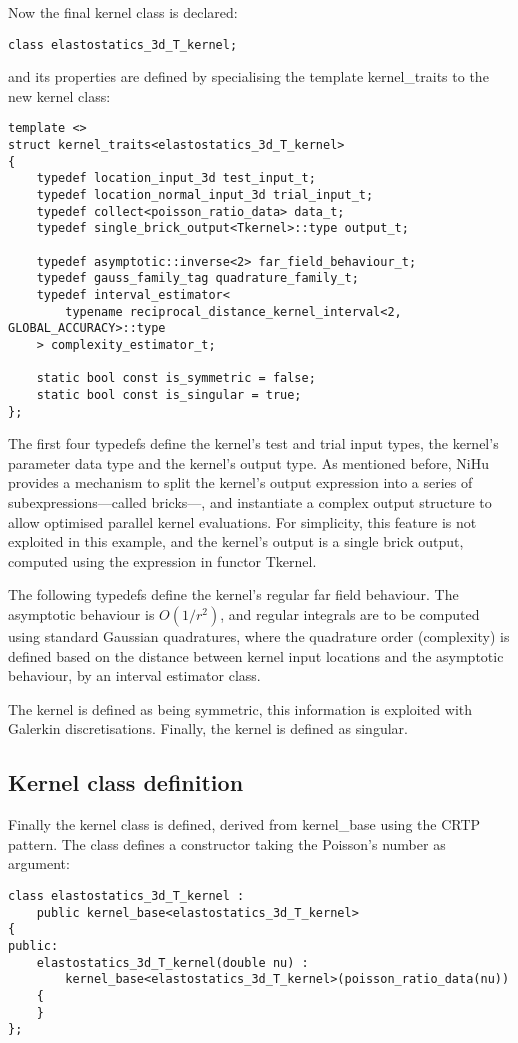 \documentclass{article}
\begin{document}
Now the final kernel class is declared:
%
\begin{lstlisting}
class elastostatics_3d_T_kernel;
\end{lstlisting}
%
and its properties are defined by specialising the template kernel\_traits to the new kernel class:
%
\begin{lstlisting}
template <>
struct kernel_traits<elastostatics_3d_T_kernel>
{
	typedef location_input_3d test_input_t;
	typedef location_normal_input_3d trial_input_t;
	typedef collect<poisson_ratio_data> data_t;
	typedef single_brick_output<Tkernel>::type output_t;
	
	typedef asymptotic::inverse<2> far_field_behaviour_t;
	typedef gauss_family_tag quadrature_family_t;
	typedef interval_estimator<
		typename reciprocal_distance_kernel_interval<2, GLOBAL_ACCURACY>::type
	> complexity_estimator_t;
	
	static bool const is_symmetric = false;
	static bool const is_singular = true;
};
\end{lstlisting}
%
The first four typedefs define the kernel's test and trial input types, the kernel's parameter data type and the kernel's output type.
As mentioned before, NiHu provides a mechanism to split the kernel's output expression into a series of subexpressions---called bricks---, and instantiate a complex output structure to allow optimised parallel kernel evaluations.
For simplicity, this feature is not exploited in this example, and the kernel's output is a single brick output, computed using the expression in functor Tkernel.

The following typedefs define the kernel's regular far field behaviour.
The asymptotic behaviour is $O(1/r^2)$, and regular integrals are to be computed using standard Gaussian quadratures, where the quadrature order (complexity) is defined based on the distance between kernel input locations and the asymptotic behaviour, by an interval estimator class.

The kernel is defined as being symmetric, this information is exploited with Galerkin discretisations.
Finally, the kernel is defined as singular.

\subsection{Kernel class definition}

Finally the kernel class is defined, derived from kernel\_base using the CRTP pattern. The class defines a constructor taking the Poisson's number as argument:
%
\begin{lstlisting}
class elastostatics_3d_T_kernel :
	public kernel_base<elastostatics_3d_T_kernel>
{
public:
	elastostatics_3d_T_kernel(double nu) :
		kernel_base<elastostatics_3d_T_kernel>(poisson_ratio_data(nu))
	{
	}
};
\end{lstlisting}
\end{document}
